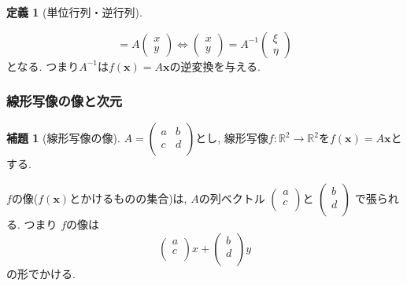 \documentclass[dvipdfmx,a4paper,11pt]{article}
\newcommand{\R}{\mathbb{R}}
\theoremstyle{definition}
\newtheorem{lem}[thm]{補題}
\newtheorem{dfn}[thm]{定義}
\begin{document}
\begin{tcolorbox}[
    colback = white,
    colframe = green!35!black,
    fonttitle = \bfseries,
    breakable = true]
\begin{dfn}[単位行列・逆行列]
\begin{enumerate}
$$ =
 A
   \begin{pmatrix}
x \\ y
 \end{pmatrix} 
  \Leftrightarrow
     \begin{pmatrix}
x \\ y
 \end{pmatrix} 
  =
  A^{-1}
    \begin{pmatrix}
\xi  \\ \eta
 \end{pmatrix}
  $$
  となる. つまり$A^{-1}$は$f(\bm{x})=A\bm{x}$の逆変換を与える.
    \end{enumerate}
    \end{dfn}
 \end{tcolorbox}
 

\subsubsection{線形写像の像と次元}
 \begin{tcolorbox}[
    colback = white,
    colframe = green!35!black,
    fonttitle = \bfseries,
    breakable = true]
    \begin{lem}[線形写像の像]
     $A=
  \begin{pmatrix}
 a& b  \\
 c& d  \\
 \end{pmatrix} 
 $とし, 線形写像$f : \R^2 \to \R^2$を$f(\bm{x})=A\bm{x}$とする.

$f$の像($f(\bm{x})$とかけるものの集合)は, $A$の列ベクトル
$
  \begin{pmatrix}
 a  \\
 c  \\
 \end{pmatrix} 
$と
$  \begin{pmatrix}
b \\
 d  \\
 \end{pmatrix} 
 $
 で張られる. つまり
 $f$の像は
 $$
 \begin{pmatrix}
 a  \\
 c  \\
 \end{pmatrix} 
 x
 +
   \begin{pmatrix}
b \\
 d  \\
 \end{pmatrix} 
 y
 $$
 の形でかける. 
  \end{lem}
 \end{tcolorbox}
 
\end{document}
